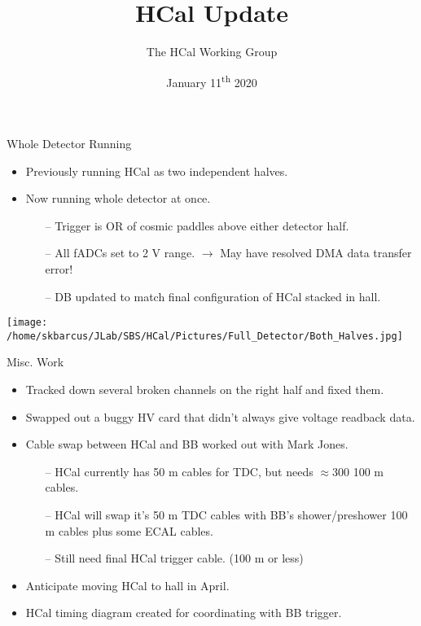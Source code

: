 \documentclass[10pt]{beamer}
\title{HCal Update}
\subtitle{}
\date{January 11\textsuperscript{th} 2020}
\author{The HCal Working Group}
\institute{Jefferson Lab}
\begin{document}
\maketitle

\begin{frame}{Whole Detector Running}

	\begin{itemize}
		\item Previously running HCal as two independent halves.
		\item Now running whole detector at once. 
			\begin{itemize}
				\item[--] Trigger is OR of cosmic paddles above either detector half.
				\item[--] All fADCs set to 2 V range. $\rightarrow$ May have resolved DMA data transfer error!
				\item[--] DB updated to match final configuration of HCal stacked in hall. 
			\end{itemize}
	\end{itemize}

	\vspace{-3mm}
	\begin{center}
	    \texttt{[image: /home/skbarcus/JLab/SBS/HCal/Pictures/Full\_Detector/Both\_Halves.jpg]}
  	\end{center}

\end{frame}

\begin{frame}{Misc. Work}

	\begin{itemize}
		\item Tracked down several broken channels on the right half and fixed them.
		\item Swapped out a buggy HV card that didn't always give voltage readback data.
		\item Cable swap between HCal and BB worked out with Mark Jones.
			\begin{itemize}
				\item[--] HCal currently has 50 m cables for TDC, but needs $\approx$300 100 m cables.
				\item[--] HCal will swap it's 50 m TDC cables with BB's shower/preshower 100 m cables plus some ECAL cables.
				\item[--] Still need final HCal trigger cable. (100 m or less)
			\end{itemize} 
		\item Anticipate moving HCal to hall in April.
		\item HCal timing diagram created for coordinating with BB trigger.
	\end{itemize}

\end{frame}
\end{document}
